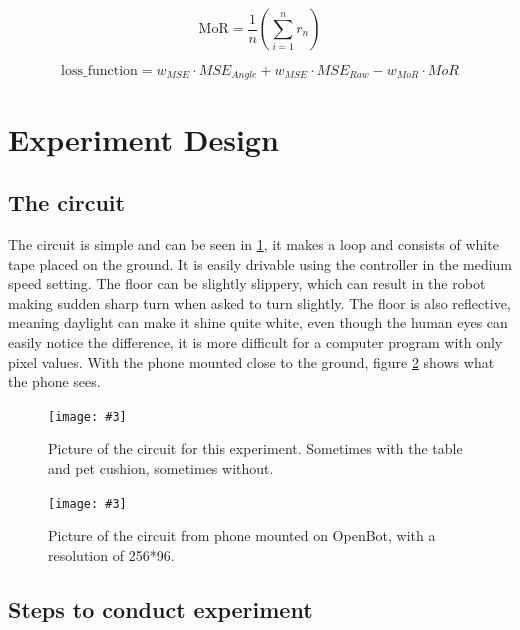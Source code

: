 \documentclass[12pt]{report}
\newcommand\insertfigure[5]{
\begin{figure}[#1]
\begin{center}
\texttt{[image: \#3]}
\end{center}
\caption{#4}
\label{#5}
\end{figure}
}
\begin{document}
\begin{equation}
\label{eq:reward}
\text{MoR} = \frac{1}{n} (\sum_{i=1}^{n} r_n)
\end{equation}

\begin{equation}
\label{eq:loss}
\text{loss\_function} = w_{MSE} \cdot MSE_{Angle} + w_{MSE} \cdot MSE_{Raw} - w_{MoR} \cdot MoR
\end{equation}

\section{Experiment Design}
\subsection{The circuit}
\label{sub:circuit}

The circuit is simple and can be seen in \ref{fig:circuit}, it makes a loop and consists of white tape placed on the ground. It is easily drivable using the controller in the medium speed setting. The floor can be slightly slippery, which can result in the robot making sudden sharp turn when asked to turn slightly. The floor is also reflective, meaning daylight can make it shine quite white, even though the human eyes can easily notice the difference, it is more difficult for a computer program with only pixel values. With the phone mounted close to the ground, figure \ref{fig:phone} shows what the phone sees.

\insertfigure{th}{0.5\textwidth}{circuit.jpg}{Picture of the circuit for this experiment. Sometimes with the table and pet cushion, sometimes without.}{fig:circuit}
\insertfigure{th}{0.5\textwidth}{phoneview.jpeg}{Picture of the circuit from phone mounted on OpenBot, with a resolution of 256*96.}{fig:phone}

\subsection{Steps to conduct experiment}
\label{sub:step}
\end{document}
